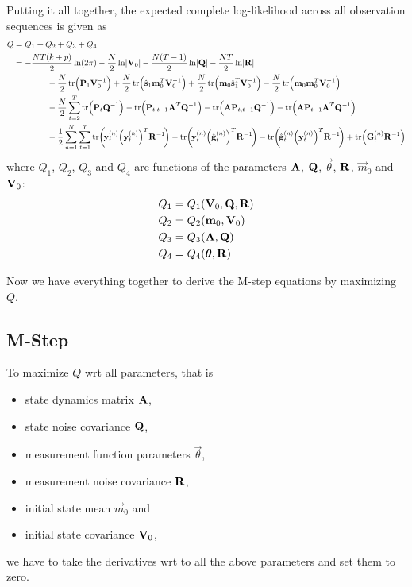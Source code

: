 Putting it all together, the expected complete log-likelihood across all observation sequences is given as
\begin{align*}
	Q
		&= Q_1 + Q_2 + Q_3 + Q_4 \\
		&= -\frac{NT(k + p)}{2} \ln(2\pi) - \frac{N}{2} \ln \lvert \mat{V}_0 \rvert - \frac{N(T - 1)}{2} \ln \lvert \mat{Q} \rvert - \frac{NT}{2} \ln \lvert \mat{R} \rvert \\
			&\qquad\qquad -\frac{N}{2} \tr\!\Big( \mat{P}_1 \mat{V}_0^{-1} \Big) + \frac{N}{2} \tr\!\Big( \hat{\vec{s}}_1 \vec{m}_0^T \mat{V}_0^{-1} \Big) + \frac{N}{2} \tr\!\Big( \vec{m}_0 \hat{\vec{s}}_1^T \mat{V}_0^{-1} \Big) - \frac{N}{2} \tr\!\Big(\vec{m}_0 \vec{m}_0^T \mat{V}_0^{-1} \Big) \\
			&\qquad\qquad -\frac{N}{2} \sum_{t = 2}^{T} \tr\!\Big( \mat{P}_t \mat{Q}^{-1} \Big) - \tr\!\Big( \mat{P}_{t, t - 1} \mat{A}^T \mat{Q}^{-1} \Big) - \tr\!\Big( \mat{A} \mat{P}_{t, t - 1} \mat{Q}^{-1} \Big) - \tr\!\Big( \mat{A} \mat{P}_{t - 1} \mat{A}^T \mat{Q}^{-1} \Big) \\
			&\qquad\qquad -\frac{1}{2} \sum_{n = 1}^{N} \sum_{t = 1}^{T} \tr\!\bigg(\! \vec{y}_t^{(n)} \Big(\vec{y}_t^{(n)}\Big)^T \mat{R}^{-1} \!\bigg) - \tr\!\bigg(\! \vec{y}_t^{(n)} \Big(\hat{\vec{g}}_t^{(n)}\Big)^T \mat{R}^{-1} \!\bigg) - \tr\!\bigg(\! \hat{\vec{g}}_t^{(n)} \Big(\vec{y}_t^{(n)}\Big)^T \mat{R}^{-1} \!\bigg) + \tr\!\Big( \mat{G}_t^{(n)} \mat{R}^{-1} \Big)
\end{align*}
where \( Q_1 \), \( Q_2 \), \( Q_3 \) and \( Q_4 \) are functions of the parameters \( \boldsymbol{\mathrm{A}} \), \( \boldsymbol{\mathrm{Q}} \), \( \vec{\theta} \), \( \boldsymbol{\mathrm{R}} \), \( \vec{m}_0 \) and \( \boldsymbol{\mathrm{V}}_0 \):
\begin{align*}
	Q_1 & = Q_1(\boldsymbol{\mathrm{V}}_0, \boldsymbol{\mathrm{Q}}, \boldsymbol{\mathrm{R}}) \\
	Q_2 & = Q_2(\boldsymbol{\mathrm{m}}_0, \boldsymbol{\mathrm{V}}_0)        \\
	Q_3 & = Q_3(\boldsymbol{\mathrm{A}}, \boldsymbol{\mathrm{Q}})            \\
	Q_4 & = Q_4(\boldsymbol{\mathrm{\theta}}, \boldsymbol{\mathrm{R}})
\end{align*}


Now we have everything together to derive the M-step equations by maximizing \(Q\).


\subsection{M-Step}
	To maximize \(Q\) \ac{wrt} all parameters, that is
	\begin{itemize}
		\item state dynamics matrix \(\boldsymbol{\mathrm{A}}\),
		\item state noise covariance \(\boldsymbol{\mathrm{Q}}\),
		\item measurement function parameters \(\vec{\theta}\),
		\item measurement noise covariance \(\boldsymbol{\mathrm{R}}\),
		\item initial state mean \(\vec{m}_0\) and
		\item initial state covariance \(\boldsymbol{\mathrm{V}}_0\),
	\end{itemize}
	we have to take the derivatives \ac{wrt} to all the above parameters and set them to zero.
	
